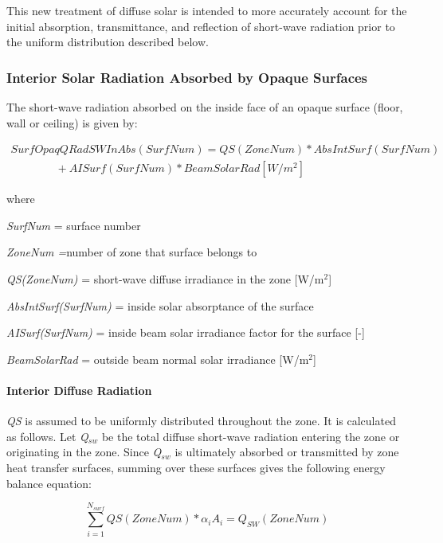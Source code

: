 This new treatment of diffuse solar is intended to more accurately account for the initial absorption, transmittance, and reflection of short-wave radiation prior to the uniform distribution described below.

\subsubsection{Interior Solar Radiation Absorbed by Opaque Surfaces}\label{interior-solar-radiation-absorbed-by-opaque-surfaces}

The short-wave radiation absorbed on the inside face of an opaque surface (floor, wall or ceiling) is given by:

\begin{equation}
\begin{array}{l}
SurfOpaqQRadSWInAbs(SurfNum) = QS(ZoneNum)*AbsIntSurf(SurfNum) \\
\quad \quad \quad \quad+ AISurf(SurfNum)*BeamSolarRad [W/m^2]
\end{array}
\label{eq:ShortWaveRadInsideFaceOpaqueSurf}
\end{equation}

where

\emph{SurfNum} = surface number

\emph{ZoneNum =}number of zone that surface belongs to

\emph{QS(ZoneNum)} = short-wave diffuse irradiance in the zone {[}W/m\(^{2}\){]}

\emph{AbsIntSurf(SurfNum)} = inside solar absorptance of the surface

\emph{AISurf(SurfNum)} = inside beam solar irradiance factor for the surface {[}-{]}

\emph{BeamSolarRad} = outside beam normal solar irradiance {[}W/m\(^{2}\){]}

\paragraph{Interior Diffuse Radiation}\label{interior-diffuse-radiation}

\emph{QS} is assumed to be uniformly distributed throughout the zone. It is calculated as follows. Let \emph{Q\(_{sw}\)} be the total diffuse short-wave radiation entering the zone or originating in the zone. Since \emph{Q\(_{sw}\)} is ultimately absorbed or transmitted by zone heat transfer surfaces, summing over these surfaces gives the following energy balance equation:

\begin{equation}
\sum\limits_{i = 1}^{{N_{surf}}} {QS(ZoneNum)*{\alpha_i}{A_i} = {Q_{SW}}(ZoneNum)}
\end{equation}

